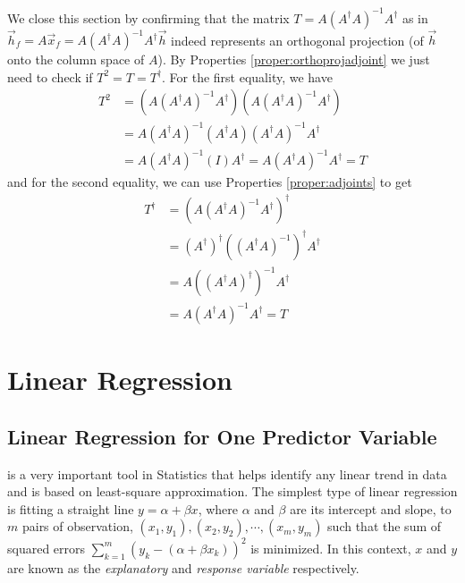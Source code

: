 We close this section by confirming that the matrix $T = A(A^\dag A)^{-1}A^\dag$ as in $\vec{h}_f = A\vec{x}_f = A(A^\dag A)^{-1}A^\dag \vec{h}$ indeed represents an orthogonal projection (of $\vec{h}$ onto the column space of $A$). By Properties \ref{proper:orthoprojadjoint} we just need to check if $T^2 = T = T^\dag$. For the first equality, we have
\begin{align*}
T^2 &= (A(A^\dag A)^{-1}A^\dag)(A(A^\dag A)^{-1}A^\dag) \\
&= A(A^\dag A)^{-1}(A^\dag A)(A^\dag A)^{-1}A^\dag \\
&= A(A^\dag A)^{-1}(I)A^\dag = A(A^\dag A)^{-1}A^\dag = T
\end{align*}
and for the second equality, we can use Properties \ref{proper:adjoints} to get
\begin{align*}
T^\dag &= (A(A^\dag A)^{-1}A^\dag)^\dag \\
&= (A^\dag)^\dag((A^\dag A)^{-1})^\dag A^\dag \\
&= A ((A^\dag A)^\dag)^{-1} A^\dag \\
&= A (A^\dag A)^{-1} A^\dag = T
\end{align*}

\section{Linear Regression}
\subsection{Linear Regression for One Predictor Variable}

 is a very important tool in Statistics that helps identify any linear trend in data and is based on least-square approximation. The simplest type of linear regression is fitting a straight line $y = \alpha + \beta x$, where $\alpha$ and $\beta$ are its intercept and slope, to $m$ pairs of observation, $(x_1, y_1), (x_2, y_2), \cdots, (x_m, y_m)$ such that the sum of squared errors $\sum_{k=1}^m (y_k - (\alpha + \beta x_k))^2$ is minimized. In this context, $x$ and $y$ are known as the \textit{explanatory} and \textit{response variable} respectively.

